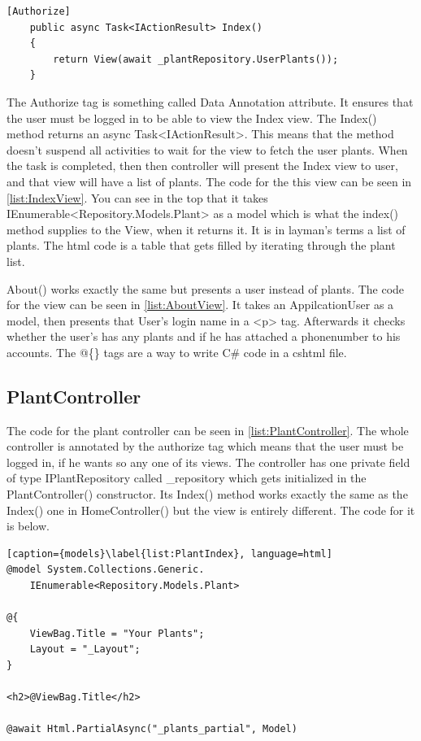 \documentclass[a4paper,12pt,oneside,openright,titlepage]{book}
\begin{document}
\begin{center}
\begin{lstlisting}[caption={Dependency Injection}, language=CSharp]
	[Authorize]
    public async Task<IActionResult> Index()
	{            
        return View(await _plantRepository.UserPlants());
	}
\end{lstlisting}
\end{center} 
The Authorize tag is something called Data Annotation attribute. It ensures that the user must be logged in to be able to view the Index view. The Index() method returns an async Task<IActionResult>. This means that the method doesn't suspend all activities to wait for the view to fetch the user plants. When the task is completed, then then controller will present the Index view to user, and that view will have a list of plants. The code for the this view can be seen in \ref{list:IndexView}. You can see in the top that it takes IEnumerable<Repository.Models.Plant> as a model which is what the index() method supplies to the View, when it returns it. It is in layman's terms a list of plants. The html code is a table that gets filled by iterating through the plant list.

About() works exactly the same but presents a user instead of plants. The code for the view can be seen in \ref{list:AboutView}. It takes an AppilcationUser as a model, then presents that User's login name in a <p> tag. Afterwards it checks whether the user's has any plants and if he has attached a phonenumber to his accounts. The @\{\} tags are a way to write C\# code in a cshtml file.


\subsection{PlantController}
The code for the plant controller can be seen in \ref{list:PlantController}. The whole controller is annotated by the authorize tag which means that the user must be logged in, if he wants so any one of its views. The controller has one private field of type IPlantRepository called \_repository which gets initialized in the PlantController() constructor. Its Index() method works exactly the same as the Index() one in HomeController() but the view is entirely different. The code for it is below.

\begin{center}
\begin{lstlisting}[caption={models}\label{list:PlantIndex}, language=html]
@model System.Collections.Generic.
	IEnumerable<Repository.Models.Plant>

@{
    ViewBag.Title = "Your Plants";
    Layout = "_Layout";
}

<h2>@ViewBag.Title</h2>

@await Html.PartialAsync("_plants_partial", Model)
\end{lstlisting}
\end{center} 
\end{document}
